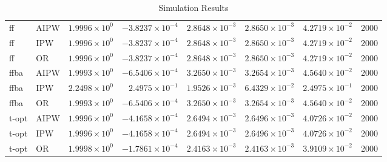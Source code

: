 \begin{table}[ht]
\begin{tabular}{llrrrrrr}
   \midrule
ff & AIPW & $1.9996 \times 10^{0}$ & $-3.8237 \times 10^{-4}$ & $2.8648 \times 10^{-3}$ & $2.8650 \times 10^{-3}$ & $4.2719 \times 10^{-2}$ & 2000 \\ 
  ff & IPW & $1.9996 \times 10^{0}$ & $-3.8237 \times 10^{-4}$ & $2.8648 \times 10^{-3}$ & $2.8650 \times 10^{-3}$ & $4.2719 \times 10^{-2}$ & 2000 \\ 
  ff & OR & $1.9996 \times 10^{0}$ & $-3.8237 \times 10^{-4}$ & $2.8648 \times 10^{-3}$ & $2.8650 \times 10^{-3}$ & $4.2719 \times 10^{-2}$ & 2000 \\ 
   \midrule
ffba & AIPW & $1.9993 \times 10^{0}$ & $-6.5406 \times 10^{-4}$ & $3.2650 \times 10^{-3}$ & $3.2654 \times 10^{-3}$ & $4.5640 \times 10^{-2}$ & 2000 \\ 
  ffba & IPW & $2.2498 \times 10^{0}$ & $2.4975 \times 10^{-1}$ & $1.9526 \times 10^{-3}$ & $6.4329 \times 10^{-2}$ & $2.4975 \times 10^{-1}$ & 2000 \\ 
  ffba & OR & $1.9993 \times 10^{0}$ & $-6.5406 \times 10^{-4}$ & $3.2650 \times 10^{-3}$ & $3.2654 \times 10^{-3}$ & $4.5640 \times 10^{-2}$ & 2000 \\ 
   \midrule
t-opt & AIPW & $1.9996 \times 10^{0}$ & $-4.1658 \times 10^{-4}$ & $2.6494 \times 10^{-3}$ & $2.6496 \times 10^{-3}$ & $4.0726 \times 10^{-2}$ & 2000 \\ 
  t-opt & IPW & $1.9996 \times 10^{0}$ & $-4.1658 \times 10^{-4}$ & $2.6494 \times 10^{-3}$ & $2.6496 \times 10^{-3}$ & $4.0726 \times 10^{-2}$ & 2000 \\ 
  t-opt & OR & $1.9998 \times 10^{0}$ & $-1.7861 \times 10^{-4}$ & $2.4163 \times 10^{-3}$ & $2.4163 \times 10^{-3}$ & $3.9109 \times 10^{-2}$ & 2000 \\ 
   \bottomrule
\end{tabular}
\caption{Simulation Results} 
\label{tab:results}
\end{table}
